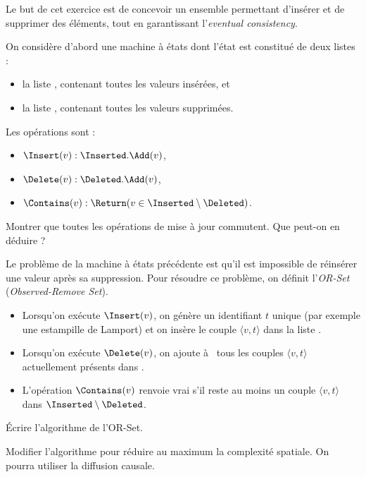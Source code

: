 
\begingroup



\begin{exercice}

  Le but de cet exercice est de concevoir un ensemble permettant d'insérer et de supprimer des éléments,
  tout en garantissant l'\emph{eventual consistency}.

  On considère d'abord une machine à états dont l'état est constitué de deux listes :
  \begin{itemize}
    \item la liste \Inserted, contenant toutes les valeurs insérées, et
    \item la liste \Deleted, contenant toutes les valeurs supprimées.
  \end{itemize}

  Les opérations sont :
  \begin{itemize}
  \item $\Insert(v): \Inserted.\Add(v)$, 
  \item $\Delete(v): \Deleted.\Add(v)$,
  \item $\Contains(v): \Return (v \in \Inserted \setminus \Deleted)$.
  \end{itemize}

  \begin{questions}
    \item Montrer que toutes les opérations de mise à jour commutent. Que peut-on en déduire ?
  \end{questions}

  Le problème de la machine à états précédente est qu'il est impossible de réinsérer une valeur après sa suppression.  
  Pour résoudre ce problème, on définit l'\emph{OR-Set} (\emph{Observed-Remove Set}).

  \begin{itemize}
  \item Lorsqu'on exécute $\Insert(v)$, on génère un identifiant $t$ unique (par exemple une estampille de Lamport) et on insère le couple $\langle v, t\rangle$ dans la liste \Inserted.  
  \item Lorsqu'on exécute $\Delete(v)$, on ajoute à \Deleted\ tous les couples $\langle v, t\rangle$ actuellement présents dans \Inserted.  
  \item L'opération $\Contains(v)$ renvoie vrai s'il reste au moins un couple $\langle v, t\rangle$ dans $\Inserted \setminus \Deleted$.
  \end{itemize}
  
  \begin{questions}
    \item Écrire l'algorithme de l'OR-Set.
    \item Modifier l'algorithme pour réduire au maximum la complexité spatiale.
      On pourra utiliser la diffusion causale.
  \end{questions}

\end{exercice}

\endgroup
\endinput
